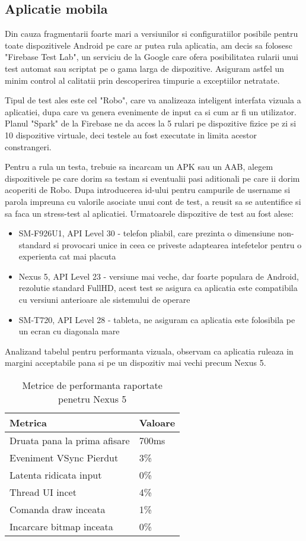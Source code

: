 \subsection {Aplicatie mobila}

Din cauza fragmentarii foarte mari a versiunilor si configuratiilor posibile pentru toate dispozitivele Android pe care ar putea rula aplicatia, am decis sa folosesc "Firebase Test Lab", un serviciu de la Google care ofera posibilitatea rularii unui test automat sau scriptat pe o gama larga de dispozitive. 
Asiguram astfel un minim control al calitatii prin descoperirea timpurie a exceptiilor netratate.

Tipul de test ales este cel "Robo", care va analizeaza inteligent interfata vizuala a aplicatiei, dupa care va genera evenimente de input ca si cum ar fi un utilizator. Planul "Spark" de la Firebase ne da acces la 5 rulari pe dispozitive fizice pe zi si 10 dispozitive virtuale, deci testele au fost executate in limita acestor constrangeri. 

Pentru a rula un testa, trebuie sa incarcam un APK sau un AAB, alegem dispozitivele pe care dorim sa testam si eventualii pasi aditionali pe care ii dorim acoperiti de Robo. Dupa introducerea id-ului pentru campurile de username si parola impreuna cu valorile asociate unui cont de test, a reusit sa se autentifice si sa faca un stress-test al aplicatiei. Urmatoarele dispozitive de test au fost alese:

\begin{itemize}
  \item SM-F926U1, API Level 30 - telefon pliabil, care prezinta o dimensiune non-standard si provocari unice in ceea ce priveste adaptearea intefetelor pentru o experienta cat mai placuta
  \item Nexus 5, API Level 23 - versiune mai veche, dar foarte populara de Android, rezolutie standard FullHD, acest test se asigura ca aplicatia este compatibila cu versiuni anterioare ale sistemului de operare
  \item SM-T720, API Level 28 - tableta, ne asiguram ca aplicatia este folosibila pe un ecran cu diagonala mare
\end{itemize}

Analizand tabelul pentru performanta vizuala, observam ca aplicatia ruleaza in margini acceptabile pana si pe un dispozitiv mai vechi precum Nexus 5.

\begin{table}[ht!]
\begin{tabular}{ll}
\hline
Metrica &  Valoare \\ 
\hline
\hline
Druata pana la prima afisare & 700ms \\
Eveniment VSync Pierdut & 3\% \\
Latenta ridicata input & 0\% \\
Thread UI incet & 4\% \\
Comanda draw inceata & 1\% \\
Incarcare bitmap inceata & 0\% \\
\hline
\end{tabular}
\centering
\caption{Metrice de performanta raportate penetru Nexus 5}
\label{tab:metrics}
\end{table}

